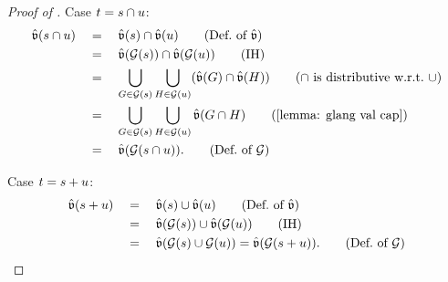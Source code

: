 \begin{proof}[Proof of ]
       Case $\term = \term[2] \cap \term[3]$:
       \begin{align*}
              \hat{\val}(\term[2] \cap \term[3]) & \quad=\quad \hat{\val}(\term[2]) \cap \hat{\val}(\term[3])                     \tag{Def.\ of $\hat{\val}$}                                                                                                  \\
                                                 & \quad=\quad \hat{\val}(\glang(\term[2])) \cap \hat{\val}(\glang(\term[3]))            \tag{IH}                                                                                                              \\
                                                 & \quad=\quad  \bigcup_{\graph[1] \in \glang(\term[2])} \bigcup_{\graph[2] \in \glang(\term[3])} (\hat{\val}(\graph[1]) \cap \hat{\val}(\graph[2]))                 \tag{$\cap$ is distributive w.r.t.\ $\cup$} \\
                                                 & \quad=\quad  \bigcup_{\graph[1] \in \glang(\term[2])} \bigcup_{\graph[2] \in \glang(\term[3])} \hat{\val}(\graph[1] \cap \graph[2]) \tag{\Cref{lemma: glang val cap}}                                       \\
                                                 & \quad=\quad \hat{\val}(\glang(\term[2] \cap \term[3])). \tag{Def.\ of $\glang$}
       \end{align*}

       Case $\term = \term[2] \union \term[3]$:
       \begin{align*}
              \hat{\val}(\term[2] \union \term[3]) & \quad=\quad \hat{\val}(\term[2]) \cup \hat{\val}(\term[3])                     \tag{Def.\ of $\hat{\val}$} \\
                                                 & \quad=\quad \hat{\val}(\glang(\term[2])) \cup \hat{\val}(\glang(\term[3]))            \tag{IH}             \\
                                                 & \quad=\quad \hat{\val}(\glang(\term[2]) \cup \glang(\term[3])) = \hat{\val}(\glang(\term[2] \union \term[3])). \tag{Def.\ of $\glang$}
       \end{align*}


\end{proof}
